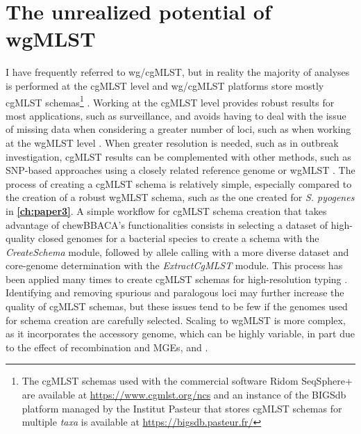 \section{The unrealized potential of wgMLST}

I have frequently referred to \ac{wg/cgMLST}, but in reality the majority of analyses is performed at the \ac{cgMLST} level and \ac{wg/cgMLST} platforms store mostly \ac{cgMLST} schemas\footnote{The \ac{cgMLST} schemas used with the commercial software Ridom SeqSphere+ are available at \url{https://www.cgmlst.org/ncs} and an instance of the \ac{BIGSdb} platform managed by the Institut Pasteur that stores \ac{cgMLST} schemas for multiple \textit{taxa} is available at \url{https://bigsdb.pasteur.fr/}} \cite{jolley_open-access_2018, dyer_enterobase_2025}. Working at the \ac{cgMLST} level provides robust results for most applications, such as surveillance, and avoids having to deal with the issue of missing data when considering a greater number of loci, such as when working at the \ac{wgMLST} level \cite{leeper_evaluation_2023, uelze_typing_2020}. When greater resolution is needed, such as in outbreak investigation, \ac{cgMLST} results can be complemented with other methods, such as \ac{SNP}-based approaches using a closely related reference genome or \ac{wgMLST} \cite{mixao_multi-country_2025, leeper_validation_2025, leeper_evaluation_2023}. The process of creating a \ac{cgMLST} schema is relatively simple, especially compared to the creation of a robust \ac{wgMLST} schema, such as the one created for \textit{S. pyogenes} in \textbf{\autoref{ch:paper3}}. A simple workflow for \ac{cgMLST} schema creation that takes advantage of chewBBACA's functionalities consists in selecting a dataset of high-quality closed genomes for a bacterial species to create a schema with the \textit{CreateSchema} module, followed by allele calling with a more diverse dataset and core-genome determination with the \textit{ExtractCgMLST} module. This process has been applied many times to create \ac{cgMLST} schemas for high-resolution typing \cite{tourasse_core_2023, de_sales_core_2020, hershko_construction_2024, kozak_core_2025, crestani_microevolution_2025, carneiro_genome-scale_2023, thorell_helicobacter_2023, feng_population_2024, jansen_van_rensburg_development_2024}. Identifying and removing spurious and paralogous loci may further increase the quality of \ac{cgMLST} schemas, but these issues tend to be few if the genomes used for schema creation are carefully selected. Scaling to \ac{wgMLST} is more complex, as it incorporates the accessory genome, which can be highly variable, in part due to the effect of recombination and \ac{MGEs}, and \cite{medini_microbial_2005, tettelin_genome_2005, costa_first_2020}.

